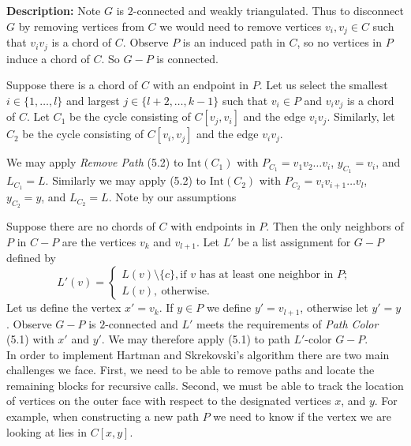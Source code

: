 \documentclass[letterpaper, 12pt]{amsart}
\theoremstyle{definition}
\theoremstyle{definition}
\theoremstyle{thm}
\theoremstyle{definition}
\begin{document}
\noindent\textbf{Description:}
Note $G$ is $2$-connected and weakly triangulated. Thus to disconnect $G$ by
removing vertices from $C$ we would need to remove vertices
$v_i,v_j\in C$ such that $v_iv_j$ is a chord of $C$.
Observe $P$ is an induced path in $C$, so no vertices in $P$ induce a chord of
$C$. So $G-P$ is connected.

Suppose there is a chord of $C$ with an endpoint in $P$. Let us select the
smallest $i\in\{1,\ldots,l\}$ and largest
$j\in\{l+2,\ldots,k-1\}$ such that $v_i\in P$ and $v_iv_j$ is a chord of $C$. Let $C_1$ be the
cycle consisting of $C[v_j,v_i]$ and the edge $v_iv_j$. Similarly, let $C_2$ be
the cycle consisting of $C[v_i,v_j]$ and the edge $v_iv_j$.

We may apply
\textit{Remove Path} (5.2) to $\text{Int}(C_1)$ with $P_{C_1}=v_1v_2\ldots v_i$, $y_{C_1}=v_i$,
and $L_{C_1}=L$. Similarly we may apply (5.2) to $\text{Int}(C_2)$ with
$P_{C_2}=v_iv_{i+1}\ldots v_l$, $y_{C_2}=y$, and $L_{C_2}=L$. Note by our assumptions 

Suppose there are no chords of $C$ with endpoints in $P$.
Then the only neighbors of $P$ in $C-P$ are the vertices $v_k$ and $v_{l+1}$.
Let $L'$ be a list assignment for $G-P$ defined by
\[
	L'(v) = \begin{cases}
				L(v)\setminus\{c\}, \text{if } v \text{ has at least one neighbor in } P;\\
				L(v), \ \text{otherwise}.
			\end{cases}
\]
Let us define the vertex $x'=v_k$. If $y\in P$ we define $y'=v_{l+1}$, otherwise let $y'=y$.
Observe $G-P$ is $2$-connected and $L'$ meets the requirements of \textit{Path Color} (5.1)
with $x'$ and $y'$. We may therefore apply (5.1) to path $L'$-color $G-P$.\\

In order to implement Hartman and Skrekovski's algorithm there are two main
challenges we face. First, we need to be able to remove paths and locate the
remaining blocks for recursive calls. Second, we must be able to track the
location of vertices on the outer face with respect to the designated vertices
$x$, and $y$. For example, when constructing a new path $P$ we need to know if
the vertex we are looking at lies in $C[x,y]$.
\end{document}
